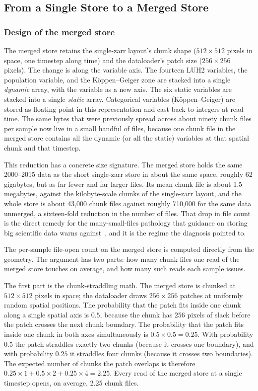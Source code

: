 \documentclass[12pt,a4paper]{article}
\begin{document}
\subsection{From a Single Store to a Merged Store}

\subsubsection{Design of the merged store}\label{sec:merged-design}

The merged store retains the single-zarr layout's chunk shape (\(512 \times 512\) pixels in
space, one timestep along time) and the dataloader's patch size (\(256 \times 256\) pixels).
The change is along the variable axis. The fourteen LUH2 variables, the population variable,
and the K\"{o}ppen--Geiger zone are stacked into a single \emph{dynamic} array, with the
variable as a new axis. The six static variables are stacked into a single \emph{static}
array. Categorical variables (K\"{o}ppen--Geiger) are stored as floating point in this
representation and cast back to integers at read time. The same bytes that were previously
spread across about ninety chunk files per sample now live in a small handful of files,
because one chunk file in the merged store contains all the dynamic (or all the static)
variables at that spatial chunk and that timestep.

This reduction has a concrete size signature. The merged store holds the same 2000--2015 data
as the short single-zarr store in about the same space, roughly 62 gigabytes, but as far fewer
and far larger files. Its mean chunk file is about 1.5 megabytes, against the kilobyte-scale
chunks of the single-zarr layout, and the whole store is about 43{,}000 chunk files against
roughly 710{,}000 for the same data unmerged, a sixteen-fold reduction in the number of files.
That drop in file count is the direct remedy for the many-small-files pathology that guidance
on storing big scientific data warns against~\cite{abernathey2021,dask_chunks}, and it is the
regime the diagnosis pointed to.

The per-sample file-open count on the merged store is computed directly from the geometry.
The argument has two parts: how many chunk files one read of the merged store touches on
average, and how many such reads each sample issues.

The first part is the chunk-straddling math. The merged store is chunked at
\(512 \times 512\) pixels in space; the dataloader draws \(256 \times 256\) patches at
uniformly random spatial positions. The probability that the patch fits inside one chunk
along a single spatial axis is \(0.5\), because the chunk has 256 pixels of slack before
the patch crosses the next chunk boundary. The probability that the patch fits inside one
chunk in both axes simultaneously is \(0.5 \times 0.5 = 0.25\). With probability \(0.5\) the
patch straddles exactly two chunks (because it crosses one boundary), and with probability
\(0.25\) it straddles four chunks (because it crosses two boundaries). The expected number
of chunks the patch overlaps is therefore
\(0.25 \times 1 + 0.5 \times 2 + 0.25 \times 4 = 2.25\). Every read of the merged store at a
single timestep opens, on average, 2.25 chunk files.
\end{document}
